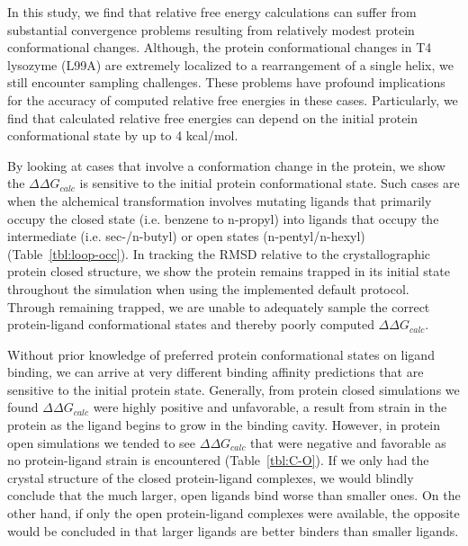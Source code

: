 \documentclass[journal=jctcce,manuscript=article]{achemso}
\begin{document}
In this study, we find that relative free energy calculations can suffer from substantial convergence problems resulting from relatively modest protein conformational changes.
Although, the protein conformational changes in T4 lysozyme (L99A) are extremely localized to a rearrangement of a single helix, we still encounter sampling challenges.
These problems have profound implications for the accuracy of computed relative free energies in these cases.
Particularly, we find that calculated relative free energies can depend on the initial protein conformational state by up to 4 kcal/mol.

By looking at cases that involve a conformation change in the protein, we show the $\Delta\Delta G_{calc}$ is sensitive to the initial protein conformational state.
Such cases are when the alchemical transformation involves mutating ligands that primarily occupy the closed state (i.e. benzene to n-propyl) into ligands that occupy the intermediate (i.e. sec-/n-butyl) or open states (n-pentyl/n-hexyl) (Table~\ref{tbl:loop-occ}).
In tracking the RMSD relative to the crystallographic protein closed structure, we show the protein remains trapped in its initial state throughout the simulation when using the implemented default protocol.
Through remaining trapped, we are unable to adequately sample the correct protein-ligand conformational states and thereby poorly computed $\Delta\Delta G_{calc}$. 

Without prior knowledge of preferred protein conformational states on ligand binding, we can arrive at very different binding affinity predictions that are sensitive to the initial protein state.
Generally, from protein closed simulations we found $\Delta\Delta G_{calc}$ were highly positive and unfavorable, a result from strain in the protein as the ligand begins to grow in the binding cavity.
However, in protein open simulations we tended to see $\Delta\Delta G_{calc}$ that were negative and favorable as no protein-ligand strain is encountered (Table~\ref{tbl:C-O}).
If we only had the crystal structure of the closed protein-ligand complexes, we would blindly conclude that the much larger, open ligands bind worse than smaller ones.
On the other hand, if only the open protein-ligand complexes were available, the opposite would be concluded in that larger ligands are better binders than smaller ligands.
\end{document}
